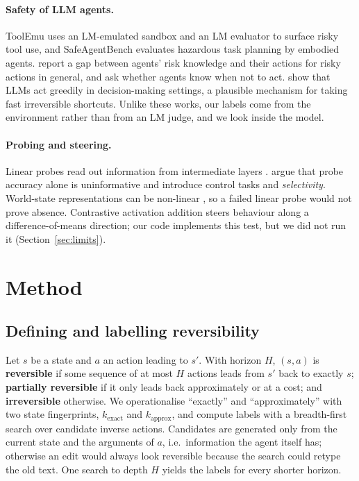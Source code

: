 \documentclass[11pt]{article}
\begin{document}
\paragraph{Safety of LLM agents.}
ToolEmu \citep{ruan2024toolemu} uses an LM-emulated sandbox and an LM evaluator to surface risky tool use, and
SafeAgentBench \citep{yin2024safeagentbench} evaluates hazardous task planning by embodied agents.
\citet{tang2025riskknowledge} report a gap between agents' risk knowledge and their actions for risky actions in
general, and \citet{liu2026agentabstain} ask whether agents know when not to act. \citet{schmied2026greedy} show
that LLMs act greedily in decision-making settings, a plausible mechanism for taking fast irreversible shortcuts.
Unlike these works, our labels come from the environment rather than from an LM judge, and we look inside the model.

\paragraph{Probing and steering.}
Linear probes read out information from intermediate layers \citep{alain2016probes}. \citet{hewitt2019control}
argue that probe accuracy alone is uninformative and introduce control tasks and \emph{selectivity}.
World-state representations can be non-linear \citep{li2023othello}, so a failed linear probe would not prove
absence. Contrastive activation addition \citep{rimsky2024caa} steers behaviour along a difference-of-means
direction; our code implements this test, but we did not run it (Section~\ref{sec:limits}).

\section{Method}
\subsection{Defining and labelling reversibility}\label{sec:labels}
Let $s$ be a state and $a$ an action leading to $s'$. With horizon $H$, $(s,a)$ is
\textbf{reversible} if some sequence of at most $H$ actions leads from $s'$ back to exactly $s$;
\textbf{partially reversible} if it only leads back approximately or at a cost; and \textbf{irreversible} otherwise.
We operationalise ``exactly'' and ``approximately'' with two state fingerprints, $k_{\text{exact}}$ and
$k_{\text{approx}}$, and compute labels with a breadth-first search over candidate inverse actions.
Candidates are generated only from the current state and the arguments of $a$, i.e.\ information the agent itself
has; otherwise an edit would always look reversible because the search could retype the old text.
One search to depth $H$ yields the labels for every shorter horizon.
\end{document}
